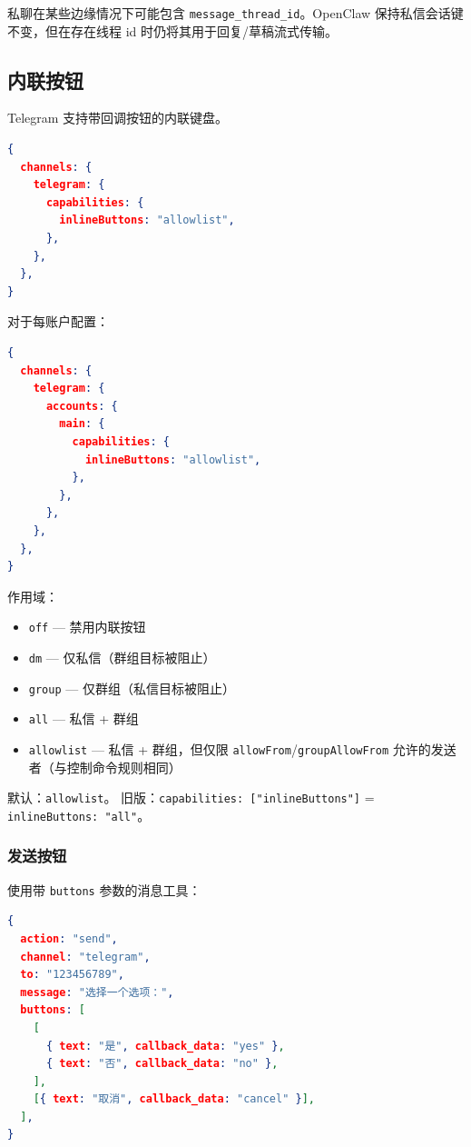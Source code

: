 私聊在某些边缘情况下可能包含 \texttt{message\_thread\_id}。OpenClaw 保持私信会话键不变，但在存在线程 id 时仍将其用于回复/草稿流式传输。

\subsection{内联按钮}


Telegram 支持带回调按钮的内联键盘。

\begin{lstlisting}[language=json]
{
  channels: {
    telegram: {
      capabilities: {
        inlineButtons: "allowlist",
      },
    },
  },
}
\end{lstlisting}


对于每账户配置：

\begin{lstlisting}[language=json]
{
  channels: {
    telegram: {
      accounts: {
        main: {
          capabilities: {
            inlineButtons: "allowlist",
          },
        },
      },
    },
  },
}
\end{lstlisting}


作用域：

\begin{itemize}
  \item \texttt{off} — 禁用内联按钮
  \item \texttt{dm} — 仅私信（群组目标被阻止）
  \item \texttt{group} — 仅群组（私信目标被阻止）
  \item \texttt{all} — 私信 + 群组
  \item \texttt{allowlist} — 私信 + 群组，但仅限 \texttt{allowFrom}/\texttt{groupAllowFrom} 允许的发送者（与控制命令规则相同）
\end{itemize}


默认：\texttt{allowlist}。
旧版：\texttt{capabilities: ["inlineButtons"]} = \texttt{inlineButtons: "all"}。

\subsubsection{发送按钮}


使用带 \texttt{buttons} 参数的消息工具：

\begin{lstlisting}[language=json]
{
  action: "send",
  channel: "telegram",
  to: "123456789",
  message: "选择一个选项：",
  buttons: [
    [
      { text: "是", callback_data: "yes" },
      { text: "否", callback_data: "no" },
    ],
    [{ text: "取消", callback_data: "cancel" }],
  ],
}
\end{lstlisting}


